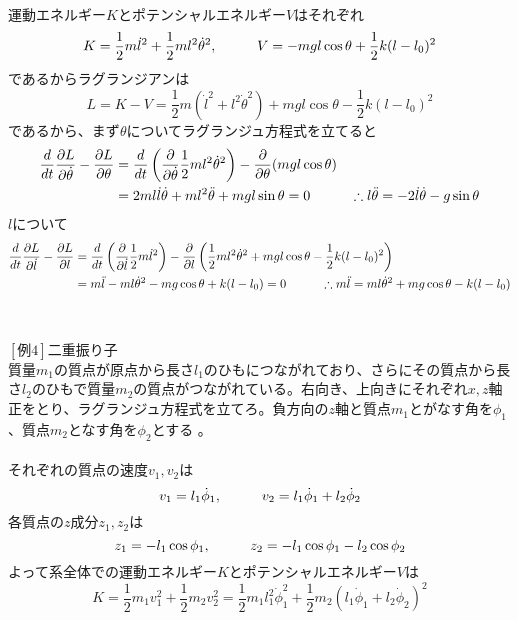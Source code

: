 \documentclass{jsarticle}
\begin{document}
\\
運動エネルギー\(K\)とポテンシャルエネルギー\(V\)はそれぞれ
\[K=\frac{1}{2}m\dot{l}^{2}+\frac{1}{2}ml^{2}\dot{\theta}^{2},\hspace{10mm}V=-mgl\cos\theta+\frac{1}{2}k(l-l_{0})^{2}\]
であるからラグランジアンは
\[L=K-V=\frac{1}{2}m(\dot{l}^{2}+l^{2}\dot{\theta}^{2})+mgl\cos\theta-\frac{1}{2}k(l-l_{0})^{2}\]
であるから、まず\(\theta\)についてラグランジュ方程式を立てると
\begin{align*}
\frac{d}{dt}\frac{\partial L}{\partial\dot{\theta}}-\frac{\partial L}{\partial\theta}&=\frac{d}{dt}\left(\frac{\partial}{\partial\dot{\theta}}\frac{1}{2}ml^{2}\dot{\theta}^{2}\right)-\frac{\partial}{\partial\theta}(mgl\cos\theta)\\
&=2ml\dot{l}\dot{\theta}+ml^{2}\ddot{\theta}+mgl\sin\theta=0\hspace{10mm}\therefore l\ddot{\theta}=-2\dot{l}\dot{\theta}-g\sin\theta
\end{align*}
\(l\)について
\begin{align*}
\frac{d}{dt}\frac{\partial L}{\partial\dot{l}}-\frac{\partial L}{\partial l}&=\frac{d}{dt}\left(\frac{\partial}{\partial\dot{l}}\frac{1}{2}m\dot{l}^{2}\right)-\frac{\partial}{\partial l}\left(\frac{1}{2}ml^{2}\dot{\theta}^{2}+mgl\cos\theta-\frac{1}{2}k(l-l_{0})^{2}\right)\\
&=m\ddot{l}-ml\dot{\theta}^{2}-mg\cos\theta+k(l-l_{0})=0\hspace{10mm}\therefore m\ddot{l}=ml\dot{\theta}^{2}+mg\cos\theta-k(l-l_{0})
\end{align*}
\\
\\
\([例4]\)二重振り子\\
質量\(m_{1}\)の質点が原点から長さ\(l_{1}\)のひもにつながれており、さらにその質点から長さ\(l_{2}\)のひもで質量\(m_{2}\)の質点がつながれている。右向き、上向きにそれぞれ\(x,z\)軸正をとり、ラグランジュ方程式を立てろ。負方向の\(z\)軸と質点\(m_{1}\)とがなす角を\(\phi_{1}\)、質点\(m_{2}\)となす角を\(\phi_{2}\)とする
。\\
\\
それぞれの質点の速度\(v_{1},v_{2}\)は
\[v_{1}=l_{1}\dot{\phi}_{1},\hspace{10mm}v_{2}=l_{1}\dot{\phi}_{1}+l_{2}\dot{\phi}_{2}\]
各質点の\(z\)成分\(z_{1},z_{2}\)は
\[z_{1}=-l_{1}\cos\phi_{1},\hspace{10mm}z_{2}=-l_{1}\cos\phi_{1}-l_{2}\cos\phi_{2}\]
よって系全体での運動エネルギー\(K\)とポテンシャルエネルギー\(V\)は
\[K=\frac{1}{2}m_{1}v_{1}^{2}+\frac{1}{2}m_{2}v_{2}^{2}=\frac{1}{2}m_{1}l_{1}^{2}\dot{\phi}_{1}^{2}+\frac{1}{2}m_{2}(l_{1}\dot{\phi}_{1}+l_{2}\dot{\phi}_{2})^{2}\]
\end{document}
